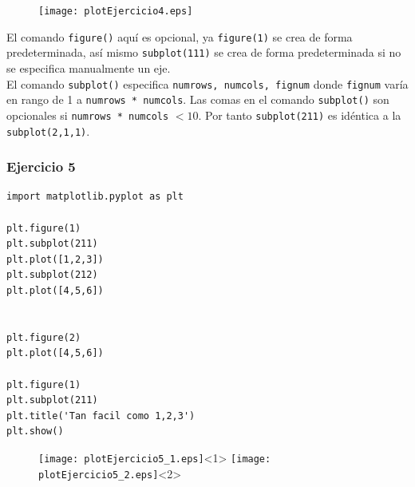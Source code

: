\begin{frame}[fragile]
\begin{figure}
	\centering
	\texttt{[image: plotEjercicio4.eps]}
\end{figure}
\end{frame}
\begin{frame}
El comando \texttt{figure()} aqu\'{i} es opcional, ya \texttt{figure(1)} se crea de forma predeterminada, as\'{i} mismo \texttt{subplot(111)} se crea de forma predeterminada si no se especifica manualmente un eje.
\\
\medskip
El comando \texttt{subplot()} especifica \texttt{numrows, numcols, fignum} donde \texttt{fignum} var\'{i}a en rango de 1 a \texttt{numrows * numcols}. Las comas en el comando \texttt{subplot()} son opcionales si \texttt{numrows * numcols} $<10$. Por tanto \texttt{subplot(211)} es id\'{e}ntica a la \texttt{subplot(2,1,1)}.
\end{frame}
\begin{frame}[fragile]
\frametitle{Ejercicio 5}
\begin{lstlisting}
import matplotlib.pyplot as plt

plt.figure(1)                
plt.subplot(211)         
plt.plot([1,2,3])
plt.subplot(212)         
plt.plot([4,5,6])


plt.figure(2)                
plt.plot([4,5,6])           

plt.figure(1)                
plt.subplot(211)         
plt.title('Tan facil como 1,2,3')
plt.show()
\end{lstlisting}
\end{frame}
\begin{frame}[fragile]
\begin{figure}
	\centering
	\texttt{[image: plotEjercicio5\_1.eps]}<1>
	\texttt{[image: plotEjercicio5\_2.eps]}<2>
\end{figure}
\end{frame}
